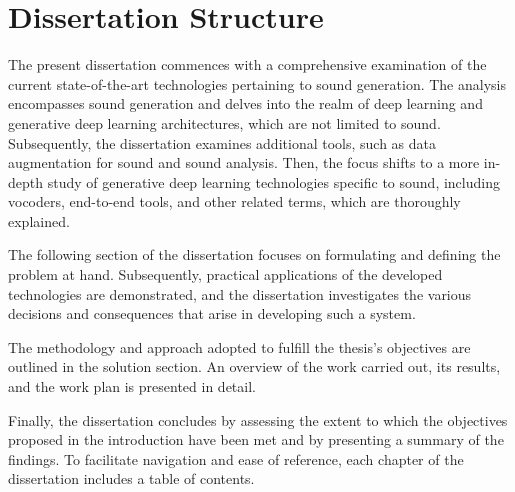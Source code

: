 \section{Dissertation Structure} \label{sec:struct}

The present dissertation commences with a comprehensive examination of the current state-of-the-art technologies pertaining to sound generation. The analysis encompasses sound generation and delves into the realm of deep learning and generative deep learning architectures, which are not limited to sound. Subsequently, the dissertation examines additional tools, such as data augmentation for sound and sound analysis. Then, the focus shifts to a more in-depth study of generative deep learning technologies specific to sound, including vocoders, end-to-end tools, and other related terms, which are thoroughly explained.

The following section of the dissertation focuses on formulating and defining the problem at hand. Subsequently, practical applications of the developed technologies are demonstrated, and the dissertation investigates the various decisions and consequences that arise in developing such a system.

The methodology and approach adopted to fulfill the thesis's objectives are outlined in the solution section. An overview of the work carried out, its results, and the work plan is presented in detail.

Finally, the dissertation concludes by assessing the extent to which the objectives proposed in the introduction have been met and by presenting a summary of the findings. To facilitate navigation and ease of reference, each chapter of the dissertation includes a table of contents.
